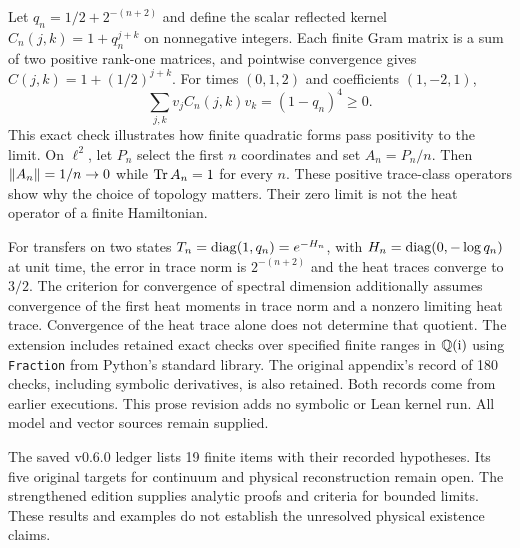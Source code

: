 Let $q_n=1/2+2^{-(n+2)}$ and define the scalar reflected kernel $C_n(j,k)=1+q_n^{j+k}$ on nonnegative integers. Each finite Gram matrix is a sum of two positive rank-one matrices, and pointwise convergence gives $C(j,k)=1+(1/2)^{j+k}$. For times $(0,1,2)$ and coefficients $(1,-2,1)$,
\[
\sum_{j,k}v_jC_n(j,k)v_k=(1-q_n)^4\geq0.
\]
This exact check illustrates how finite quadratic forms pass positivity to the limit.
On $\ell^2$, let $P_n$ select the first $n$ coordinates and set $A_n=P_n/n$. Then $\left\lVert A_n\right\rVert=1/n\to0$ while $\operatorname{Tr} A_n=1$ for every $n$. These positive trace-class operators show why the choice of topology matters. Their zero limit is not the heat operator of a finite Hamiltonian.

For transfers on two states $T_n=\operatorname{diag}(1,q_n)=e^{-H_n}$, with $H_n=\operatorname{diag}(0,-\log q_n)$ at unit time, the error in trace norm is $2^{-(n+2)}$ and the heat traces converge to $3/2$. The criterion for convergence of spectral dimension additionally assumes convergence of the first heat moments in trace norm and a nonzero limiting heat trace. Convergence of the heat trace alone does not determine that quotient.
The extension includes retained exact checks over specified finite ranges in $\mathbb Q(\mathrm i)$ using \texttt{Fraction} from Python's standard library. The original appendix's record of 180 checks, including symbolic derivatives, is also retained. Both records come from earlier executions. This prose revision adds no symbolic or Lean kernel run. All model and vector sources remain supplied.

The saved v0.6.0 ledger lists 19 finite items with their recorded hypotheses. Its five original targets for continuum and physical reconstruction remain open. The strengthened edition supplies analytic proofs and criteria for bounded limits. These results and examples do not establish the unresolved physical existence claims.
